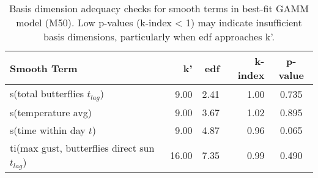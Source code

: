 \begin{table}[htbp]
\centering
\caption{Basis dimension adequacy checks for smooth terms in best-fit GAMM model (M50). Low p-values (k-index < 1) may indicate insufficient basis dimensions, particularly when edf approaches k'.}
\label{tab:gam_basis_check}
\begin{tabular}{lrrrc}
\toprule
Smooth Term & k' & edf & k-index & p-value \\
\midrule
s(total butterflies $t_{lag}$) & 9.00 & 2.41 & 1.00 & 0.735 \\
s(temperature avg) & 9.00 & 3.67 & 1.02 & 0.895 \\
s(time within day $t$) & 9.00 & 4.87 & 0.96 & 0.065 \\
ti(max gust, butterflies direct sun $t_{lag}$) & 16.00 & 7.35 & 0.99 & 0.490 \\
\bottomrule
\end{tabular}
\end{table}
